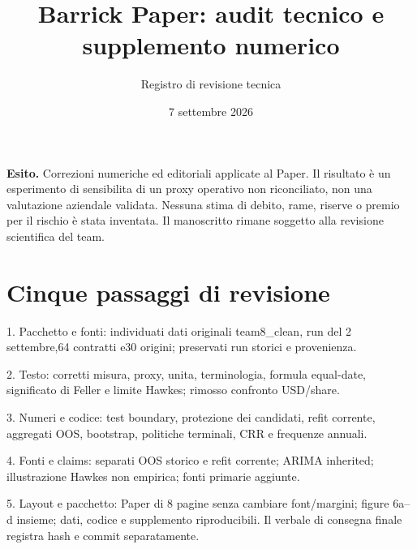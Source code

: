 \documentclass[10pt,a4paper]{article}
\title{Barrick Paper: audit tecnico e supplemento numerico}
\author{Registro di revisione tecnica}\date{7 settembre 2026}
\begin{document}
\maketitle
\textbf{Esito.} Correzioni numeriche ed editoriali applicate al Paper. Il risultato è un esperimento di sensibilita di un proxy operativo non riconciliato, non una valutazione aziendale validata. Nessuna stima di debito, rame, riserve o premio per il rischio è stata inventata. Il manoscritto rimane soggetto alla revisione scientifica del team.
\section{Cinque passaggi di revisione}
1. Pacchetto e fonti: individuati dati originali team8\_clean, run del 2 settembre,64 contratti e30 origini; preservati run storici e provenienza.\par
2. Testo: corretti misura, proxy, unita, terminologia, formula equal-date, significato di Feller e limite Hawkes; rimosso confronto USD/share.\par
3. Numeri e codice: test boundary, protezione dei candidati, refit corrente, aggregati OOS, bootstrap, politiche terminali, CRR e frequenze annuali.\par
4. Fonti e claims: separati OOS storico e refit corrente; ARIMA inherited; illustrazione Hawkes non empirica; fonti primarie aggiunte.\par
5. Layout e pacchetto: Paper di 8 pagine senza cambiare font/margini; figure 6a--d insieme; dati, codice e supplemento riproducibili. Il verbale di consegna finale registra hash e commit separatamente.
\end{document}
